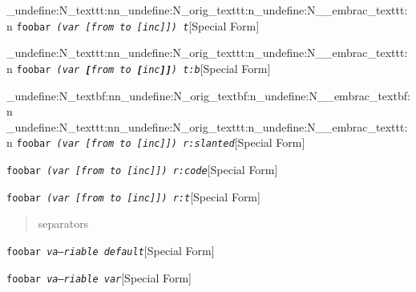 \documentclass{book}
\begin{document}
\ExplSyntaxOn%
\cs_undefine:N{\embrac_texttt:nn}\cs_undefine:N{\embrac_orig_texttt:n}\cs_undefine:N{\__embrac_texttt:n}%
\ExplSyntaxOff%
%
\noindent\texttt{foobar \EmbracOn{}\textnormal{\textsl{(var \texttt{[}from to \texttt{[}inc\texttt{{]}{]}}) t}}\EmbracOff{}}\hfill[Special Form]


\ExplSyntaxOn%
\cs_undefine:N{\embrac_texttt:nn}\cs_undefine:N{\embrac_orig_texttt:n}\cs_undefine:N{\__embrac_texttt:n}%
\ExplSyntaxOff%
%
\noindent\texttt{foobar \EmbracOn{}\textnormal{\textsl{(var \texttt{\textbf{[}}from to \texttt{\textbf{[}}inc\texttt{\textbf{{]}{]}}}) t:b}}\EmbracOff{}}\hfill[Special Form]


\ExplSyntaxOn%
\cs_undefine:N{\embrac_textbf:nn}\cs_undefine:N{\embrac_orig_textbf:n}\cs_undefine:N{\__embrac_textbf:n}%
\cs_undefine:N{\embrac_texttt:nn}\cs_undefine:N{\embrac_orig_texttt:n}\cs_undefine:N{\__embrac_texttt:n}%
\ExplSyntaxOff%
%
\noindent\texttt{foobar \EmbracOn{}\textnormal{\textsl{(var \EmbracOff{}\textnormal{\textsl{[}}\EmbracOn{}from to \EmbracOff{}\textnormal{\textsl{[}}\EmbracOn{}inc\EmbracOff{}\textnormal{\textsl{{]}{]}}}\EmbracOn{}) r:slanted}}\EmbracOff{}}\hfill[Special Form]



%
\noindent\texttt{foobar \EmbracOn{}\textnormal{\textsl{(var \EmbracOff{}\textnormal{\texttt{[}}\EmbracOn{}from to \EmbracOff{}\textnormal{\texttt{[}}\EmbracOn{}inc\EmbracOff{}\textnormal{\texttt{{]}{]}}}\EmbracOn{}) r:code}}\EmbracOff{}}\hfill[Special Form]



%
\noindent\texttt{foobar \EmbracOn{}\textnormal{\textsl{(var \EmbracOff{}\textnormal{\texttt{[}}\EmbracOn{}from to \EmbracOff{}\textnormal{\texttt{[}}\EmbracOn{}inc\EmbracOff{}\textnormal{\texttt{{]}{]}}}\EmbracOn{}) r:t}}\EmbracOff{}}\hfill[Special Form]



%
\begin{quote}
separators
\end{quote}

\noindent\texttt{foobar \EmbracOn{}\textnormal{\textsl{va---riable default}}\EmbracOff{}}\hfill[Special Form]



%
\noindent\texttt{foobar \EmbracOn{}\textnormal{\textsl{\textsl{va---riable} var}}\EmbracOff{}}\hfill[Special Form]
\end{document}
